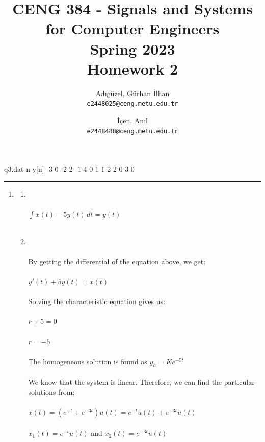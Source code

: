 \documentclass[10pt,a4paper, margin=1in]{article}
\author{
  Adıgüzel, Gürhan İlhan\\
  \texttt{e2448025@ceng.metu.edu.tr}
  \and
  İçen, Anıl\\
  \texttt{e2448488@ceng.metu.edu.tr}
}
\title{CENG 384 - Signals and Systems for Computer Engineers \\
Spring 2023 \\
Homework 2}
\begin{document}
\maketitle

\begin{filecontents}{q3.dat}
  n  y[n]
 -3  0
 -2  2
 -1  4
  0  1
  1  2
  2  0
  3  0
\end{filecontents}

\noindent\rule{19cm}{1.2pt}

\begin{enumerate}

\item %
    \begin{enumerate}
        \item %
        \\\\ $\int x(t) - 5y(t) \,dt = y(t)$
        \\\\
        \item %
        \\\\ By getting the differential of the equation above, we get:
        \\\\ \hspace*{50} $y'(t) + 5y(t) = x(t)$
        \\\\ Solving the characteristic equation gives us:
        \\\\ \hspace*{50} $r+5 = 0$
        \\\\ \hspace*{50} $r=-5$
        \\\\ The homogeneous solution is found as $y_{h} = Ke^{-5t}$
        \\\\ We know that the system is linear. Therefore, we can find the particular solutions from:
        \\\\ \hspace*{50} $x(t) = (e^{-t} + e^{-3t})u(t) = e^{-t}u(t) + e^{-3t}u(t)$
        \\\\ \hspace*{50} $x_{1}(t) =e^{-t}u(t) $ and $x_{2}(t) =e^{-3t}u(t)$

\end{enumerate}
\end{enumerate}
\end{document}
